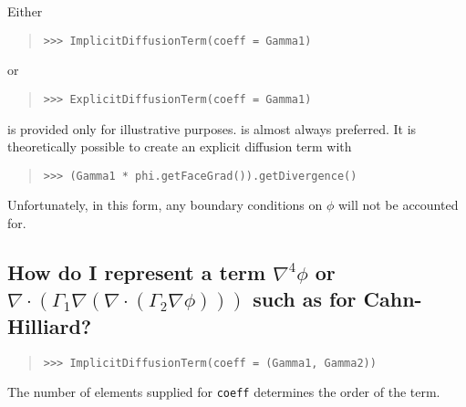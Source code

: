             Either
           \begin{quote}
\begin{verbatim}
>>> ImplicitDiffusionTerm(coeff = Gamma1)
\end{verbatim}
           \end{quote}
           or 
           \begin{quote}
\begin{verbatim}
>>> ExplicitDiffusionTerm(coeff = Gamma1)
\end{verbatim}
           \end{quote}
            is provided only for illustrative purposes.
            is almost always preferred. It is
           theoretically possible to create an explicit diffusion term with
           \begin{quote}
\begin{verbatim}
>>> (Gamma1 * phi.getFaceGrad()).getDivergence()
\end{verbatim}
           \end{quote}
           Unfortunately, in this form, any boundary conditions on $\phi$
           will not be accounted for.

            
           
           \subsection{How do I represent a term $\nabla^4 \phi$ or
            $\nabla \cdot \left( \Gamma_1 \nabla \left(
            \nabla\cdot\left( 
            \Gamma_2 \nabla \phi\right) \right) \right) $ such as for 
            Cahn-Hilliard? \label{FAQ-higherOrderDiffusion}}
          \hspace*{\fill}
            
          \begin{quote}
\begin{verbatim}
>>> ImplicitDiffusionTerm(coeff = (Gamma1, Gamma2))
\end{verbatim}
          \end{quote}
          The number of elements supplied for \verb|coeff| determines the
          order of the term.

